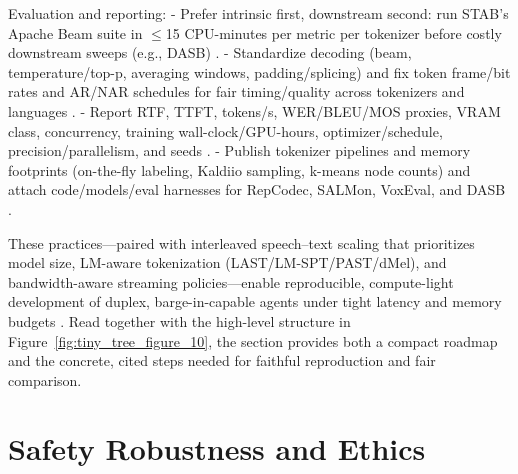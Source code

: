 \documentclass{article}
\begin{document}
Evaluation and reporting:
- Prefer intrinsic first, downstream second: run STAB's Apache Beam suite in $\leq$15 CPU-minutes per metric per tokenizer before costly downstream sweeps (e.g., DASB) \cite{vashishth2024stabspeechtokenizerassessmentbenchmark,mousavi2024dasbdiscreteaudiospeechbenchmark}.
- Standardize decoding (beam, temperature/top-p, averaging windows, padding/splicing) and fix token frame/bit rates and AR/NAR schedules for fair timing/quality across tokenizers and languages \cite{vashishth2024stabspeechtokenizerassessmentbenchmark,onda2025benchmarkingprosodyencodingdiscretespeec,entry2025indicsuperbspeechprocessinguniversalperf}.
- Report RTF, TTFT, tokens/s, WER/BLEU/MOS proxies, VRAM class, concurrency, training wall-clock/GPU-hours, optimizer/schedule, precision/parallelism, and seeds \cite{maimon2025slammingtrainingspeechlanguagemodelonegp,chen2023reducingbarriersselfsupervisedlearninghu,maimon2025scalinganalysisinterleavedspeechtextlang}.
- Publish tokenizer pipelines and memory footprints (on-the-fly labeling, Kaldiio sampling, k-means node counts) and attach code/models/eval harnesses for RepCodec, SALMon, VoxEval, and DASB \cite{chen2023reducingbarriersselfsupervisedlearninghu,huang2024repcodecspeechrepresentationcodectokeniz,maimon2025salmonsuiteacousticlanguagemodelevaluati,cui2025voxevalbenchmarkingknowledgeunderstandin,mousavi2024dasbdiscreteaudiospeechbenchmark}.

These practices---paired with interleaved speech--text scaling that prioritizes model size, LM-aware tokenization (LAST/LM-SPT/PAST/dMel), and bandwidth-aware streaming policies---enable reproducible, compute-light development of duplex, barge-in-capable agents under tight latency and memory budgets \cite{turetzky2024lastlanguagemodelawarespeechtokenization,jo2025lmsptalignedsemanticdistillationspeechto,har-tuv2025pastphoneticacousticspeechtokenizer,bai2025dmelspeechtokenizationmadesimple,maimon2025scalinganalysisinterleavedspeechtextlang}. Read together with the high-level structure in Figure~\ref{fig:tiny_tree_figure_10}, the section provides both a compact roadmap and the concrete, cited steps needed for faithful reproduction and fair comparison.






\section{Safety Robustness and Ethics} \label{sec:safetyrobustnessandethics}
\end{document}
